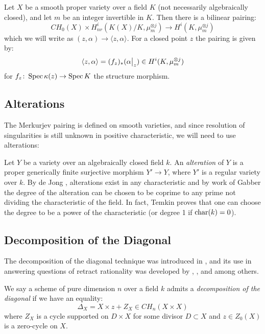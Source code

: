 \begin{proposition}
	\label{prop:MerkurjevPairing}
	Let $X$ be a smooth proper variety over a field $K$ (not necessarily algebraically closed), and let $m$ be an integer invertible in $K$. Then there is a bilinear pairing:
	\[CH_0(X) \times H_{nr}^i(K(X)/K,\mu_m^{\otimes j}) \to H^i(K,\mu_m^{\otimes j})\]
	which we will write as $(z,\alpha) \to \langle z,\alpha \rangle$. For a closed point $z$ the pairing is given by:
	\[\langle z,\alpha \rangle = (f_z)_*(\restr{\alpha}{z}) \in H^i(K,\mu_m^{\otimes j})\]
	for $f_z \colon \operatorname{Spec} \kappa(z) \to \operatorname{Spec} K$ the structure morphism.
\end{proposition}

\subsection{Alterations}
The Merkurjev pairing is defined on smooth varieties, and since resolution of singularities is still unknown in positive characteristic, we will need to use alterations:

Let $Y$ be a variety over an algebraically closed field $k$. An \emph{alteration} of $Y$ is a proper generically finite surjective morphism $Y' \to Y$, where $Y'$ is a regular variety over $k$. By de Jong \cite{deJ96}, alterations exist in any characteristic and by work of Gabber the degree of the alteration can be chosen to be coprime to any prime not dividing the characteristic of the field. In fact, Temkin proves that one can choose the degree to be a power of the characteristic \cite[Theorem 1.2.5]{Tem17}(or degree 1 if $\operatorname{char}(k)=0$).



\subsection{Decomposition of the Diagonal}
The decomposition of the diagonal technique was introduced in \cite{BSCorrespondences}, and its use in answering questions of retract rationality was developed by \cite{VoisinDoubleQuartic}, \cite{ColliotThelenePirutka} \cite{Tot16}, \cite{SchreiederHypersurface} and \cite{SchreiederTorsionOrders} among others.

\begin{definition}
We say a scheme of pure dimension $n$ over a field $k$ admits a \emph{decomposition of the diagonal} if we have an equality:
\[\Delta_X = X \times z  + Z_X \in CH_n(X \times X) \]
where $Z_X$ is a cycle supported on $D \times X$ for some divisor $D \subset X$ and $z \in Z_0(X)$ is a zero-cycle on $X$.
\end{definition}

